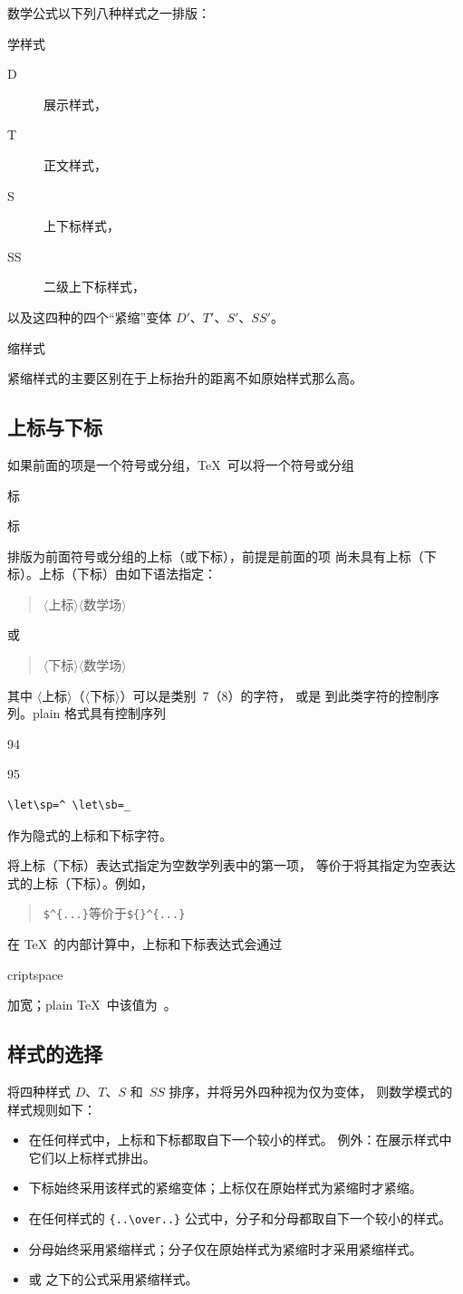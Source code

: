 \documentclass[a4paper]{rapport3}
\makeatletter
\def\gr#1{$\langle$#1$\rangle$}\def\key#1{{\tt#1}}
\newenvironment{disp}{\begin{quotation}}{\end{quotation}}
\def\term#1\par{\index{#1}}
\def\cstoidx#1\par{\index{#1@\cs{#1}}}
\def\csidx#1{\cstoidx #1\par\cs{#1}}
\makeatother
\begin{document}
数学公式以下列八种样式之一排版：\term 数学样式\par
\begin{description} \item [D]
展示样式，\item [T]
正文样式，\item [S]
上下标样式，\item [SS]
二级上下标样式，
\end{description}
以及这四种的四个“紧缩”变体 $D'$、$T'$、$S'$、$SS'$。
\term 紧缩样式\par
紧缩样式的主要区别在于上标抬升的距离不如原始样式那么高。

\subsection{上标与下标}

如果前面的项是一个符号或分组，\TeX\ 可以将一个符号或分组
\term 上标\par\term 下标\par
排版为前面符号或分组的上标（或下标），前提是前面的项
尚未具有上标（下标）。上标（下标）由如下语法指定：
\begin{disp}\gr{上标}\gr{数学场}\end{disp}
或
\begin{disp}\gr{下标}\gr{数学场}\end{disp}
其中 \gr{上标}（\gr{下标}）可以是类别~7（8）的字符，
或是  到此类字符的控制序列。plain 格式具有控制序列
\cstoidx\char94\par\cstoidx\char95\par
\begin{verbatim}
\let\sp=^ \let\sb=_
\end{verbatim}
作为隐式的上标和下标字符。

将上标（下标）表达式指定为空数学列表中的第一项，
等价于将其指定为空表达式的上标（下标）。例如，\begin{disp}
\verb>$^{...}>\quad 等价于\quad \verb>${}^{...}>\end{disp}

在 \TeX\ 的内部计算中，上标和下标表达式会通过 \csidx{scriptspace}
加宽；plain \TeX\ 中该值为~\n{0.5pt}。

\subsection{样式的选择}

将四种样式 $D$、$T$、$S$ 和~$SS$ 排序，并将另外四种视为仅为变体，
则数学模式的样式规则如下：
\begin{itemize}\item 在任何样式中，上标和下标都取自下一个较小的样式。
例外：在展示样式中它们以上标样式排出。
\item 下标始终采用该样式的紧缩变体；上标仅在原始样式为紧缩时才紧缩。
\item 在任何样式的 \verb-{..\over..}- 公式中，分子和分母都取自下一个较小的样式。
\item 分母始终采用紧缩样式；分子仅在原始样式为紧缩时才采用紧缩样式。
\item {} 或  之下的公式采用紧缩样式。\end{itemize}
\end{document}
